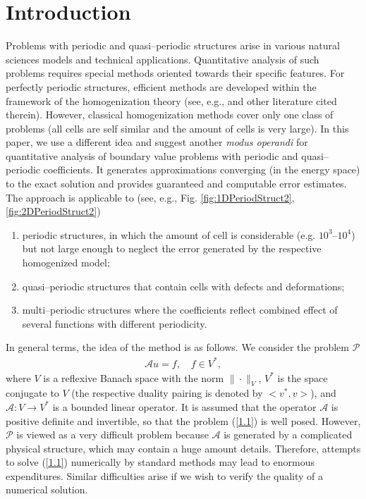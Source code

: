 \documentclass[amstex,amstext,amsfonts,epsf,12pt] {amsart}
\newcommand\ben{\begin{eqnarray}}
\newcommand\een{\end{eqnarray}}
\def\ben{\begin{eqnarray}}
\def\een{\end{eqnarray}}
\begin{document}
\section{Introduction}

Problems with periodic and quasi--periodic structures arise
in various natural sciences models and technical applications. 
Quantitative analysis of such problems requires 
special methods oriented towards their specific features. 
For  perfectly periodic structures, efficient
methods are developed within the framework of the homogenization theory 
(see, e.g., \cite{Bakhvalov,Bensoussan,Jikov} and other literature cited therein).
However, classical homogenization methods cover only one  class
of problems (all cells are self similar and the amount of cells is very large).
In this paper, we use a different idea and suggest another  {\em modus operandi}
for quantitative analysis 
of  boundary value problems with periodic and quasi--periodic coefficients. It
generates approximations converging (in the energy space) to the exact
solution  and provides guaranteed and computable error estimates. 
The approach is applicable to 
(see, e.g., Fig. \ref{fig:1DPeriodStruct2}, \ref{fig:2DPeriodStruct2})
\begin{enumerate}
\item
 periodic structures, in
which  the amount of cell is considerable (e.g. $10^3$--$10^4$) but not  large enough
to neglect the error generated by the respective homogenized model;
\item
 quasi--periodic structures that contain cells with defects
 and deformations;
\item
multi--periodic structures  where the coefficients reflect combined effect of several
functions with different periodicity.  
\end{enumerate}

In general terms, the idea of the method is as follows.
We consider the problem $\mathcal P$
\ben
\label{1.1}
\mathcal{A}  u=f, \quad f\in V^*,
\een
where $V$ is a reflexive Banach space with the norm $\|\cdot\|_V$, $V^*$ is the space conjugate
to $V$ (the respective duality pairing is denoted by $<v^*,v>$), 
and $\mathcal{A}:V\rightarrow V^*$ is a bounded linear operator. 
It is assumed that the operator $\mathcal{A}$ is positive 
definite and invertible, so that the problem (\ref{1.1}) is well posed. 
However, $\mathcal P$ is viewed as a very difficult problem because $\mathcal{A}$ is generated
by a complicated  physical structure, which may contain a huge amount details.  
Therefore, attempts to solve (\ref{1.1}) numerically by standard methods may lead 
to enormous expenditures. Similar difficulties arise if we wish
to  verify the quality of a numerical solution.
\end{document}
